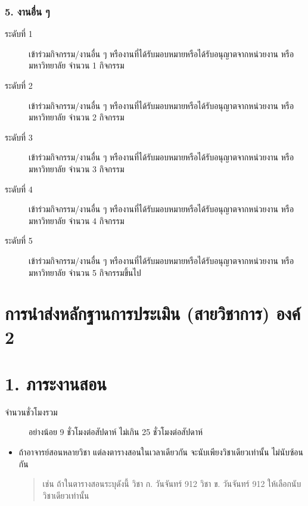 \documentclass[a4paper,12pt,english]{sphinxmanual}
\begin{document}
\subsection{5. งานอื่น ๆ}
\label{\detokenize{submission_part1:id17}}\begin{description}
\item[{ระดับที่ 1}] \leavevmode
เข้าร่วมกิจกรรม/งานอื่น ๆ หรืองานที่ได้รับมอบหมายหรือได้รับอนุญาตจากหน่วยงาน หรือมหาวิทยาลัย จำนวน 1 กิจกรรม

\item[{ระดับที่ 2}] \leavevmode
เข้าร่วมกิจกรรม/งานอื่น ๆ หรืองานที่ได้รับมอบหมายหรือได้รับอนุญาตจากหน่วยงาน หรือมหาวิทยาลัย จำนวน 2 กิจกรรม

\item[{ระดับที่ 3}] \leavevmode
เข้าร่วมกิจกรรม/งานอื่น ๆ หรืองานที่ได้รับมอบหมายหรือได้รับอนุญาตจากหน่วยงาน หรือมหาวิทยาลัย จำนวน 3 กิจกรรม

\item[{ระดับที่ 4}] \leavevmode
เข้าร่วมกิจกรรม/งานอื่น ๆ หรืองานที่ได้รับมอบหมายหรือได้รับอนุญาตจากหน่วยงาน หรือมหาวิทยาลัย จำนวน 4 กิจกรรม

\item[{ระดับที่ 5}] \leavevmode
เข้าร่วมกิจกรรม/งานอื่น ๆ หรืองานที่ได้รับมอบหมายหรือได้รับอนุญาตจากหน่วยงาน หรือมหาวิทยาลัย จำนวน 5 กิจกรรมขึ้นไป

\end{description}


\chapter{การนำส่งหลักฐานการประเมิน (สายวิชาการ) องค์ 2}
\label{\detokenize{submission_part2:id1}}\label{\detokenize{submission_part2::doc}}

\chapter{1. ภาระงานสอน}
\label{\detokenize{1teaching:id1}}\label{\detokenize{1teaching::doc}}\begin{description}
\item[{จำนวนชั่วโมงรวม}] \leavevmode
อย่างน้อย 9 ชั่วโมงต่อสัปดาห์ ไม่เกิน 25 ชั่วโมงต่อสัปดาห์

\end{description}
\begin{itemize}
\item {} 
ถ้าอาจารย์สอนหลายวิชา แต่ลงตารางสอนในเวลาเดียวกัน จะนับเพียงวิชาเดียวเท่านั้น ไม่นับซ้อนกัน
\begin{quote}

เช่น ถ้าในตารางสอนระบุดังนี้
วิชา ก. วันจันทร์ 9\sphinxhyphen{}12
วิชา ข. วันจันทร์ 9\sphinxhyphen{}12
ให้เลือกนับวิชาเดียวเท่านั้น
\end{quote}

\end{itemize}
\end{document}
